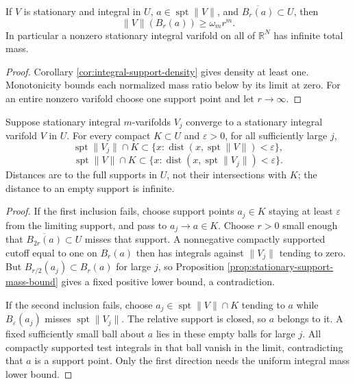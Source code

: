 \begin{proposition}\label{prop:stationary-support-mass-bound}
If $V$ is stationary and integral in $U$, $a\in\operatorname{spt}\|V\|$, and $\overline{B_r(a)}\subset U$, then
\[
 \|V\|(B_r(a))\geq\omega_m r^m.
\]
In particular a nonzero stationary integral varifold on all of $\mathbb R^N$ has infinite total mass.
\end{proposition}
\begin{proof}
Corollary \ref{cor:integral-support-density} gives density at least one. Monotonicity bounds each normalized mass ratio below by its limit at zero. For an entire nonzero varifold choose one support point and let $r\to\infty$.
\end{proof}

\begin{proposition}\label{prop:stationary-support-convergence}
Suppose stationary integral $m$-varifolds $V_j$ converge to a stationary integral varifold $V$ in $U$. For every compact $K\subset U$ and $\varepsilon>0$, for all sufficiently large $j$,
\[
 \operatorname{spt}\|V_j\|\cap K\subset
 \{x:\operatorname{dist}(x,\operatorname{spt}\|V\|)<\varepsilon\},
\]
\[
 \operatorname{spt}\|V\|\cap K\subset
 \{x:\operatorname{dist}(x,\operatorname{spt}\|V_j\|)<\varepsilon\}.
\]
Distances are to the full supports in $U$, not their intersections with $K$; the distance to an empty support is infinite.
\end{proposition}
\begin{proof}
If the first inclusion fails, choose support points $a_j\in K$ staying at least $\varepsilon$ from the limiting support, and pass to $a_j\to a\in K$. Choose $r>0$ small enough that $\overline{B_{2r}(a)}\subset U$ misses that support. A nonnegative compactly supported cutoff equal to one on $B_r(a)$ then has integrals against $\|V_j\|$ tending to zero. But $B_{r/2}(a_j)\subset B_r(a)$ for large $j$, so Proposition \ref{prop:stationary-support-mass-bound} gives a fixed positive lower bound, a contradiction.

If the second inclusion fails, choose $a_j\in\operatorname{spt}\|V\|\cap K$ tending to $a$ while $B_\varepsilon(a_j)$ misses $\operatorname{spt}\|V_j\|$. The relative support is closed, so $a$ belongs to it. A fixed sufficiently small ball about $a$ lies in these empty balls for large $j$. All compactly supported test integrals in that ball vanish in the limit, contradicting that $a$ is a support point. Only the first direction needs the uniform integral mass lower bound.
\end{proof}
